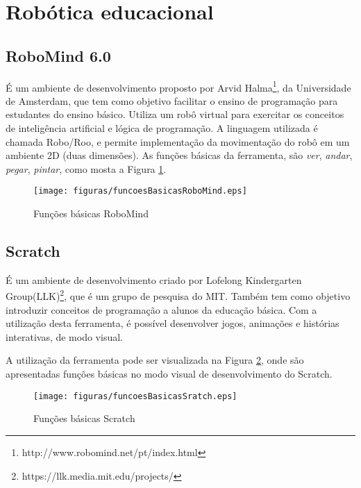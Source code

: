 \section{Robótica educacional} %
\label{sec:robótica_educacional_suporte}

	\subsection{RoboMind 6.0} %
	\label{sub:robomind}

		É um ambiente de desenvolvimento proposto por Arvid Halma\footnote{http://www.robomind.net/pt/index.html}, da Universidade de Amsterdam, que tem como objetivo facilitar o ensino de programação para estudantes do ensino básico. Utiliza um robô virtual para exercitar os conceitos de inteligência artificial e lógica de programação. A linguagem utilizada é chamada Robo/Roo, e permite implementação da movimentação do robô em um ambiente 2D (duas dimensões). As funções básicas da ferramenta, são \textit{ver}, \textit{andar}, \textit{pegar}, \textit{pintar}, como mosta a Figura \ref{img:funcoesBasicasRoboMind}.

		\begin{figure}[H]
			\centering
			\texttt{[image: figuras/funcoesBasicasRoboMind.eps]}
			\caption[Funções básicas RoboMind]{Funções básicas RoboMind}
			\label{img:funcoesBasicasRoboMind}
		\end{figure}


	\subsection{Scratch} %
	\label{sub:scratch}

		É um ambiente de desenvolvimento criado por Lofelong Kindergarten Group(LLK)\footnote{https://llk.media.mit.edu/projects/}, que é um grupo de pesquisa do MIT. Também tem como objetivo introduzir conceitos de programação a alunos da educação básica. Com a utilização desta ferramenta, é possível desenvolver jogos, animações e histórias interativas, de modo visual.

		A utilização da ferramenta pode ser visualizada na Figura \ref{img:funcoesBasicasScratch}, onde são apresentadas funções básicas no modo visual de desenvolvimento do Scratch.

		\begin{figure}[H]
			\centering
			\texttt{[image: figuras/funcoesBasicasSratch.eps]}
			\caption[Funções básicas Scratch]{Funções básicas Scratch}
			\label{img:funcoesBasicasScratch}
		\end{figure}


